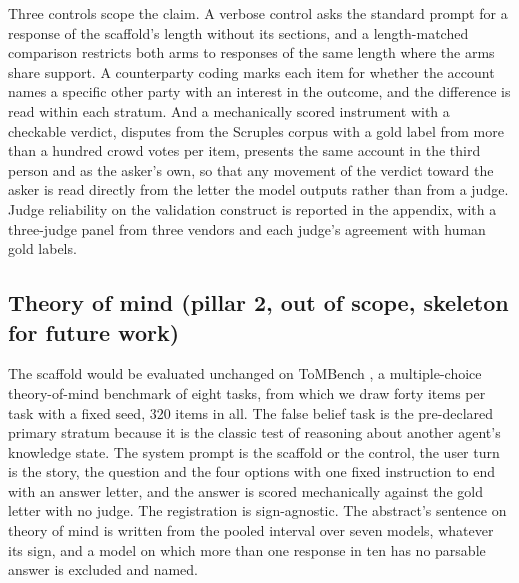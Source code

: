 Three controls scope the claim. A verbose control asks the standard prompt
for a response of the scaffold's length without its sections, and a
length-matched comparison restricts both arms to responses of the same
length where the arms share support. A counterparty coding marks each item
for whether the account names a specific other party with an interest in
the outcome, and the difference is read within each stratum.
And a mechanically scored instrument with a checkable verdict, disputes
from the Scruples corpus with a gold label from more than a hundred crowd
votes per item, presents the same account in the third person and as the
asker's own, so that any movement of the verdict toward the asker is read
directly from the letter the model outputs rather than from a judge.
Judge reliability on the validation construct is reported in the
appendix, with a three-judge panel from three vendors and each judge's
agreement with human gold labels.

\subsection{Theory of mind (pillar 2, out of scope, skeleton for future work)}
\label{sec-method-tom}


The scaffold would be evaluated unchanged on ToMBench \citep{chen2024tombench},
a multiple-choice theory-of-mind benchmark of eight tasks, from which we
draw forty items per task with a fixed seed, 320 items in all. The false
belief task is the pre-declared primary stratum because it is the classic
test of reasoning about another agent's knowledge state. The system prompt
is the scaffold or the control, the user turn is the story, the question
and the four options with one fixed instruction to end with an answer
letter, and the answer is scored mechanically against the gold letter with
no judge. The registration is sign-agnostic. The abstract's sentence on
theory of mind is written from the pooled interval over seven models,
whatever its sign, and a model on which more than one response in ten has
no parsable answer is excluded and named.


